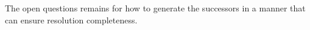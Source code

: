 \documentclass[letterpaper,10pt]{article} %
\begin{document}
The open questions remains for how to generate the successors in a manner that can ensure resolution completeness.








\end{document}

